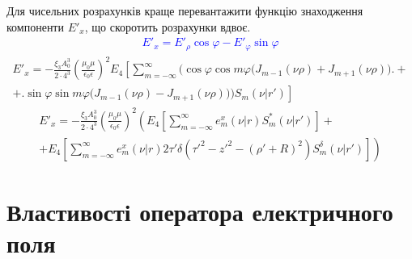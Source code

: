 %
Для чисельних розрахунків краще перевантажити функцію знаходження компоненти 
$ E'_x $, що скоротить розрахунки вдвоє.
%
\textcolor{blue} { \begin{equation*} \begin{aligned}
E'_x = E'_\rho \cos \varphi - E'_\varphi \sin \varphi
\end{aligned} \end{equation*} }
%
\begin{equation*} \begin{aligned}
E'_x = - \frac{\xi_3 A_0^3}{2 \cdot 4^3}
\left( \frac{\mu_0 \mu} {\epsilon_0 \epsilon} \right)^2
E_4 \left[ \sum_{m=-\infty}^\infty
\Big( \cos \varphi \cos m \varphi 
\big( J_{m-1}(\nu \rho) + J_{m+1}(\nu \rho) \big) \Big. \right. + \\
+ \left. \Big. \sin \varphi \sin m \varphi 
\big( J_{m-1}(\nu \rho) - J_{m+1}(\nu \rho) \big) \Big) 
S_m (\nu | r') \right]
\end{aligned} \end{equation*}
%
\begin{equation*} \begin{aligned}
E'_x = - \frac{\xi_3 A_0^3}{2 \cdot 4^3} \left(
\frac{\mu_0 \mu} {\epsilon_0 \epsilon} \right)^2
\left( E_4 \left[ \sum_{m=-\infty}^\infty 
e_m^x (\nu | r) S_m^* (\nu | r') \right] \right. + \\
+ \left. E_4 \left[ \sum_{m=-\infty}^\infty 
e_m^x (\nu | r) 2 \tau' \delta \left( {\tau'}^2 - {z'}^2 - (\rho'+R)^2 \right) 
S_m^\delta (\nu | r') \right] \right)
\end{aligned} \end{equation*}

\section{Властивості оператора електричного поля}

